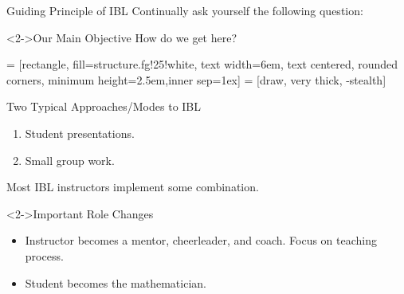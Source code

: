 \documentclass[10pt]{beamer}
\begin{document}
\begin{frame}

\begin{block}{Guiding Principle of IBL}
Continually ask yourself the following question:

\vspace{1em}


\end{block}

\begin{block}<2->{Our Main Objective}
How do we get here?

\begin{center}
 = [rectangle, fill=structure.fg!25!white, text width=6em, text centered, rounded corners, minimum height=2.5em,inner sep=1ex]
 = [draw, very thick, -stealth]
\end{center}
\end{block}

\end{frame}


\begin{frame}

\begin{block}{Two Typical Approaches/Modes to IBL}
\begin{enumerate}
\item Student presentations.
\item Small group work.
\end{enumerate}
Most IBL instructors implement some combination.
\end{block}

\begin{block}<2->{Important Role Changes}
\begin{itemize}
\item Instructor becomes a mentor, cheerleader, and coach. Focus on teaching process.
\item Student becomes the mathematician.
\end{itemize}
\end{block}

\end{frame}
\end{document}
